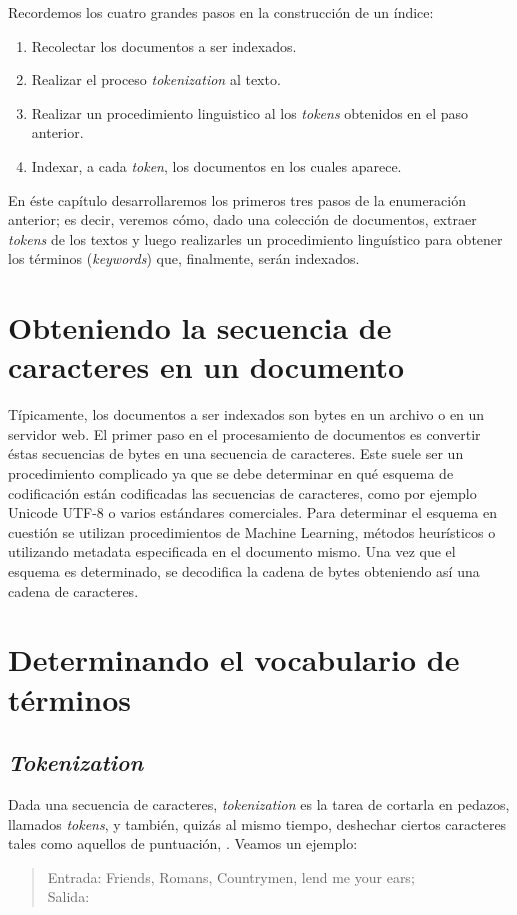 Recordemos los cuatro grandes pasos en la construcción de un índice:
\begin{enumerate}
	\item Recolectar los documentos a ser indexados.
	\item Realizar el proceso \textit{tokenization} al texto.
	\item Realizar un procedimiento linguistico al los \textit{tokens} obtenidos en el paso anterior.
	\item Indexar, a cada \textit{token}, los documentos en los cuales aparece.
\end{enumerate}

En éste capítulo desarrollaremos los primeros tres pasos de la enumeración anterior; es decir, veremos cómo, dado una colección de documentos, extraer \textit{tokens} de los textos y luego realizarles un procedimiento linguístico para obtener los términos (\textit{keywords}) que, finalmente, serán indexados.

\section{Obteniendo la secuencia de caracteres en un documento}
	Típicamente, los documentos a ser indexados son bytes en un archivo o en un servidor web. El primer paso en el procesamiento de documentos es convertir éstas secuencias de bytes en una secuencia de caracteres. Este suele ser un procedimiento complicado ya que se debe determinar en qué esquema de codificación están codificadas las secuencias de caracteres, como por ejemplo Unicode UTF-8 o varios estándares comerciales. Para determinar el esquema en cuestión se utilizan procedimientos de Machine Learning, métodos heurísticos o utilizando metadata especificada en el documento mismo. Una vez que el esquema es determinado, se decodifica la cadena de bytes obteniendo así una cadena de caracteres.
	
\section{Determinando el vocabulario de términos}
	\subsection{\textit{Tokenization}}
		Dada una secuencia de caracteres, \textit{tokenization} es la tarea de cortarla en pedazos, llamados \textit{tokens}, y también, quizás al mismo tiempo, deshechar ciertos caracteres tales como aquellos de puntuación, \cite{manning2009}. Veamos un ejemplo:
		\begin{quote}
			Entrada: Friends, Romans, Countrymen, lend me your ears; \\
			Salida:       
		\end{quote}
		
